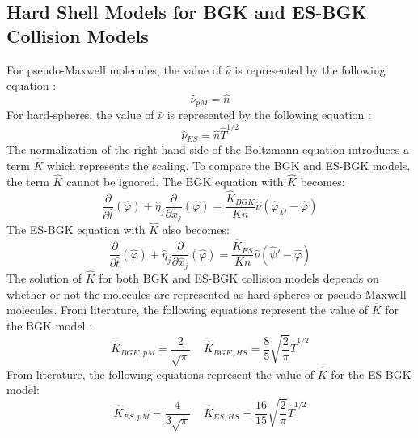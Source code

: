 \documentclass[a4paper]{article}
\begin{document}
\subsection{Hard Shell Models for BGK and ES-BGK Collision Models}
For pseudo-Maxwell molecules, the value of $\hat{\nu}$ is represented by the following equation \cite{Varghese_BGK}:
\begin{equation}
    \hat{\nu}_{pM} = \hat{n}
\end{equation}
For hard-spheres, the value of $\hat{\nu}$ is represented by the following equation \cite{Varghese_BGK}:
\begin{equation}
    \hat{\nu}_{ES} = \hat{n}\hat{T}^{1/2}
\end{equation}
The normalization of the right hand side of the Boltzmann equation introduces a term $\hat{K}$ which represents the scaling. To compare the BGK and ES-BGK models, the term $\hat{K}$ cannot be ignored. The BGK equation with $\hat{K}$ becomes:
\begin{equation}
    \dfrac{\partial}{\partial \hat{t}}(\hat{\varphi}) + \hat{\eta}_j \dfrac{\partial}{\partial \hat{x}_j} (\hat{\varphi})  = \dfrac{\hat{K}_{BGK}}{Kn}\hat{\nu} (\hat{\varphi}_M - \hat{\varphi})
\end{equation}
The ES-BGK equation with $\hat{K}$ also becomes:
\begin{equation}
    \dfrac{\partial}{\partial \hat{t}}(\hat{\varphi}) + \hat{\eta}_j \dfrac{\partial}{\partial \hat{x}_j} (\hat{\varphi})  = \dfrac{\hat{K}_{ES}}{Kn}\hat{\nu} (\hat{\psi} ' - \hat{\varphi})
\end{equation}
The solution of $\hat{K}$ for both BGK and ES-BGK collision models depends on whether or not the molecules are represented as hard spheres or pseudo-Maxwell molecules. From literature, the following equations represent the value of $\hat{K}$ for the BGK model \cite{Varghese_BGK}:
\begin{equation}
    \hat{K}_{BGK, pM} = \dfrac{2}{\sqrt{\pi}} \,\,\,\,\,\,\, \hat{K}_{BGK, HS} = \dfrac{8}{5} \sqrt{\dfrac{2}{\pi}} \hat{T}^{1/2}
\end{equation}
From literature, the following equations represent the value of $\hat{K}$ for the ES-BGK model:
\begin{equation}
    \hat{K}_{ES, pM} = \dfrac{4}{3\sqrt{\pi}} \,\,\,\,\,\,\, \hat{K}_{ES, HS} = \dfrac{16}{15} \sqrt{\dfrac{2}{\pi}} \hat{T}^{1/2}
\end{equation}
\end{document}
